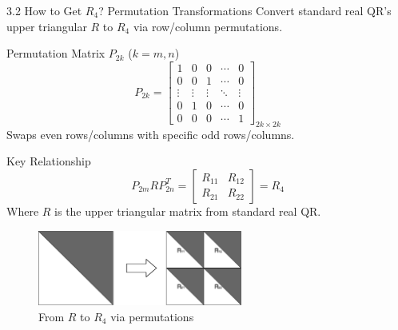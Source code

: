 \documentclass{beamer}
\begin{document}
\begin{frame}{3.2 How to Get $R_4$? Permutation Transformations}
  Convert standard real QR's upper triangular $R$ to $R_4$ via row/column permutations.
  
  \begin{block}{Permutation Matrix $P_{2k}$ ($k=m,n$)}
    \[
    P_{2k} = \begin{bmatrix}
    1 & 0 & 0 & \cdots & 0 \\
    0 & 0 & 1 & \cdots & 0 \\
    \vdots & \vdots & \vdots & \ddots & \vdots \\
    0 & 1 & 0 & \cdots & 0 \\
    0 & 0 & 0 & \cdots & 1
    \end{bmatrix}_{2k \times 2k}
    \]
    Swaps even rows/columns with specific odd rows/columns.
  \end{block}
  
  \begin{block}{Key Relationship}
    \[
    P_{2m} R P_{2n}^T = \begin{bmatrix} R_{11} & R_{12} \\ R_{21} & R_{22} \end{bmatrix} = R_4
    \]
    Where $R$ is the upper triangular matrix from standard real QR.
  \end{block}
  
  \begin{figure}[h]
    \centering
    \includegraphics[width=0.6\textwidth]{images/Figure_1.png} %
    \caption{From $R$ to $R_4$ via permutations}
  \end{figure}
\end{frame}
\end{document}
